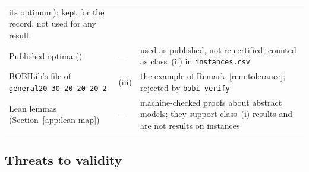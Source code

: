 {\begin{longtable}{@{}>{\raggedright\arraybackslash}p{2.35in}l>{\raggedright\arraybackslash}p{3.0in}@{}}
its optimum); kept for the record, not used for any result\\[2pt]
Published optima (\NumLitOptimal{}) & --- & used as published, not re-certified;
counted as class~(ii) in \texttt{instances.csv}\\[2pt]
BOBILib's file of \texttt{general20-30-20-20-20-2} & (iii) & the example of
Remark~\ref{rem:tolerance}; rejected by \texttt{bobi verify}\\[2pt]
Lean lemmas (Section~\ref{app:lean-map}) & --- & machine-checked proofs about
abstract models; they support class~(i) results and are not results on
instances\\
\end{longtable}
}
\addtocounter{table}{-1}

\subsection{Threats to validity}\label{app:threats}

